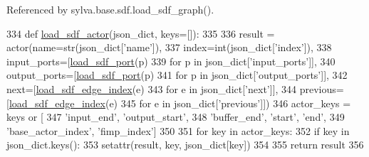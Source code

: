 Referenced by sylva.\+base.\+sdf.\+load\+\_\+sdf\+\_\+graph().


\begin{DoxyCode}
334     \textcolor{keyword}{def }\hyperlink{namespacesylva_1_1base_1_1sdf_a14b2bfbb0fd81d1e114b670f13f718f1}{load\_sdf\_actor}(json\_dict, keys=[]):
335 
336         result = actor(name=str(json\_dict[\textcolor{stringliteral}{'name'}]),
337                        index=int(json\_dict[\textcolor{stringliteral}{'index'}]),
338                        input\_ports=[\hyperlink{namespacesylva_1_1base_1_1sdf_a72bbd0e1cd0a666269ac3f17427954b8}{load\_sdf\_port}(p)
339                                     \textcolor{keywordflow}{for} p \textcolor{keywordflow}{in} json\_dict[\textcolor{stringliteral}{'input\_ports'}]],
340                        output\_ports=[\hyperlink{namespacesylva_1_1base_1_1sdf_a72bbd0e1cd0a666269ac3f17427954b8}{load\_sdf\_port}(p)
341                                      \textcolor{keywordflow}{for} p \textcolor{keywordflow}{in} json\_dict[\textcolor{stringliteral}{'output\_ports'}]],
342                        next=[\hyperlink{namespacesylva_1_1base_1_1sdf_a67886f481ab9be68797400241d754f64}{load\_sdf\_edge\_index}(e)
343                              \textcolor{keywordflow}{for} e \textcolor{keywordflow}{in} json\_dict[\textcolor{stringliteral}{'next'}]],
344                        previous=[\hyperlink{namespacesylva_1_1base_1_1sdf_a67886f481ab9be68797400241d754f64}{load\_sdf\_edge\_index}(e)
345                                  \textcolor{keywordflow}{for} e \textcolor{keywordflow}{in} json\_dict[\textcolor{stringliteral}{'previous'}]])
346         actor\_keys = keys \textcolor{keywordflow}{or} [
347             \textcolor{stringliteral}{'input\_end'}, \textcolor{stringliteral}{'output\_start'},
348             \textcolor{stringliteral}{'buffer\_end'}, \textcolor{stringliteral}{'start'}, \textcolor{stringliteral}{'end'},
349             \textcolor{stringliteral}{'base\_actor\_index'}, \textcolor{stringliteral}{'fimp\_index'}]
350 
351         \textcolor{keywordflow}{for} key \textcolor{keywordflow}{in} actor\_keys:
352             \textcolor{keywordflow}{if} key \textcolor{keywordflow}{in} json\_dict.keys():
353                 setattr(result, key, json\_dict[key])
354 
355         \textcolor{keywordflow}{return} result
356 
\end{DoxyCode}
\mbox{\label{namespacesylva_1_1base_1_1sdf_acd1ba464e47476a5205de3e3856fbb83}} 
